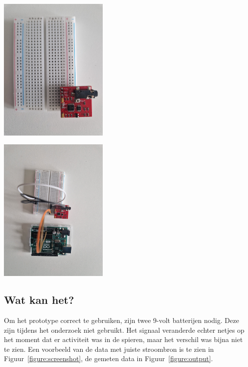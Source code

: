 \begin{center}
    \includegraphics[width=0.4\textwidth]{./graphics/img-step1.jpg}
    \label{figure:stepa}
\end{center}

\begin{center}
    \includegraphics[width=0.4\textwidth]{./graphics/img-step2.jpg}
    \label{figure:stepb}
\end{center}

\subsection{Wat kan het?}

Om het prototype correct te gebruiken, zijn twee 9-volt batterijen nodig.
Deze zijn tijdens het onderzoek niet gebruikt.
Het signaal veranderde echter netjes op het moment dat er activiteit was in de spieren,
maar het verschil was bijna niet te zien.
Een voorbeeld van de data met juiste stroombron is te zien in Figuur~\ref{figure:screenshot}, 
de gemeten data in Figuur~\ref{figure:output}.

